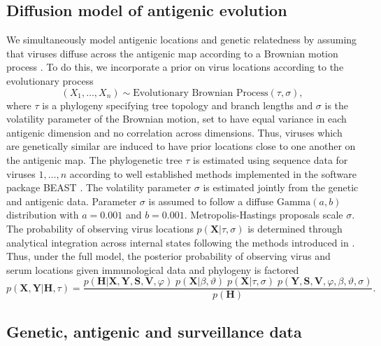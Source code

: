 \documentclass[11pt,oneside,letterpaper]{article}
\newcommand{\mdssd}{\varphi}						%
\newcommand{\diffusionsd}{\sigma}					%
\newcommand{\driftsd}{\vartheta}					%
\newcommand{\tree}{\tau}							%
\newcommand{\vn}{n}									%
\begin{document}
\subsection*{Diffusion model of antigenic evolution}

We simultaneously model antigenic locations and genetic relatedness by assuming that viruses diffuse across the antigenic map according to a Brownian motion process \cite{Lemey10}.
To do this, we incorporate a prior on virus locations according to the evolutionary process
\begin{equation}
	(X_1,\ldots,X_n) \sim \mbox{Evolutionary Brownian Process}(\tree, \diffusionsd),
\end{equation}
where $\tree$ is a phylogeny specifying tree topology and branch lengths and $\diffusionsd$ is the volatility parameter of the Brownian motion,  set to have equal variance in each antigenic dimension and no correlation across dimensions.
Thus, viruses which are genetically similar are induced to have prior locations close to one another on the antigenic map.
The phylogenetic tree $\tree$ is estimated using sequence data for viruses $1,\ldots,\vn$ according to well established methods implemented in the software package BEAST \cite{BEAST, BEAST17}.
The volatility parameter $\diffusionsd$ is estimated jointly from the genetic and antigenic data.
Parameter $\diffusionsd$ is assumed to follow a diffuse $\mbox{Gamma}(a, b)$ distribution with $a=0.001$ and $b=0.001$.
Metropolis-Hastings proposals scale $\diffusionsd$.
The probability of observing virus locations $p(\mathbf{X}|\tree,\diffusionsd)$ is determined through analytical integration across internal states following the methods introduced in \cite{Lemey10}.
Thus, under the full model, the posterior probability of observing virus and serum locations given immunological data and phylogeny is factored
\begin{equation}
	p(\mathbf{X},\mathbf{Y} | \mathbf{H},\tree) = \frac{ p(\mathbf{H}|\mathbf{X},\mathbf{Y},\mathbf{S},\mathbf{V}, \mdssd) \; 
	p(\mathbf{X} | \beta, \driftsd) \;
	p(\mathbf{X} | \tree, \diffusionsd) \; 
	p(\mathbf{Y},\mathbf{S},\mathbf{V},\mdssd,\beta,\driftsd,\diffusionsd)}{ p(\mathbf{H}) }.
\end{equation}

\subsection*{Genetic, antigenic and surveillance data}
\end{document}

